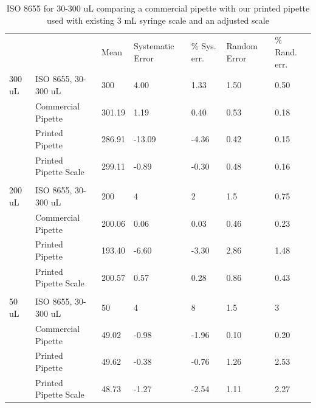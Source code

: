 \documentclass[10pt,letterpaper]{article}
\begin{document}
\begin{table}[!ht]
\begin{adjustwidth}{-2.25in}{0in} %
\centering
\caption{ISO 8655 for 30-300 uL comparing a commercial pipette with our printed pipette used with existing 3 mL syringe scale and an adjusted scale}
\label{table2}
\begin{tabular}{lllllll}
       &                       & Mean   & Systematic Error & \% Sys. err. & Random Error & \% Rand. err. \\
300 uL & ISO 8655, 30-300 uL   & 300    & 4.00             & 1.33         & 1.50         & 0.50          \\
       & Commercial Pipette    & 301.19 & 1.19             & 0.40         & 0.53         & 0.18          \\
       & Printed Pipette       & 286.91 & -13.09           & -4.36        & 0.42         & 0.15          \\
       & Printed Pipette Scale & 299.11 & -0.89            & -0.30        & 0.48         & 0.16          \\
       &                       &        &                  &              &              &               \\
200 uL & ISO 8655, 30-300 uL   & 200    & 4                & 2            & 1.5          & 0.75          \\
       & Commercial Pipette    & 200.06 & 0.06             & 0.03         & 0.46         & 0.23          \\
       & Printed Pipette       & 193.40 & -6.60            & -3.30        & 2.86         & 1.48          \\
       & Printed Pipette Scale & 200.57 & 0.57             & 0.28         & 0.86         & 0.43          \\
       &                       &        &                  &              &              &               \\
50 uL  & ISO 8655, 30-300 uL   & 50     & 4                & 8            & 1.5          & 3             \\
       & Commercial Pipette    & 49.02  & -0.98            & -1.96        & 0.10         & 0.20          \\
       & Printed Pipette       & 49.62  & -0.38            & -0.76        & 1.26         & 2.53          \\
       & Printed Pipette Scale & 48.73  & -1.27            & -2.54        & 1.11         & 2.27          \\

\end{tabular}
\end{adjustwidth}
\end{table}
\end{document}

